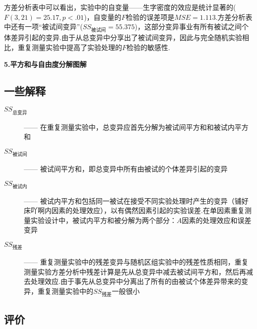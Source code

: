 方差分析表中可以看出，实验中的自变量——生字密度的效应是统计显著的($F \left( 3,21 \right) = 25.17, p < .01 $)，自变量的$F$检验的误差项是$MSE=1.113$.方差分析表中还有一项“被试间变异”($SS_{\text{被试间}}=55.375$)，这部分变异事业有所有被试之间个体差异引起的变异.由于从总变异中分享出了被试间变异，因此与完全随机实验相比，重复测量实验中提高了实验处理的$F$检验的敏感性.

\textbf{5.平方和与自由度分解图解}

\subsection{一些解释}

\begin{description}
\item[$SS_{\text{总变异}}$] —— 在重复测量实验中，总变异应首先分解为被试间平方和和被试内平方和
\item [$SS_{\text{被试间}}$] —— 被试间平方和，即总变异中所有由被试的个体差异引起的变异
\item [$SS_{\text{被试内}}$] —— 被试内平方和包括同一被试在接受不同实验处理时产生的变异（铺好床吖啊内因素的处理效应），以有偶然因素引起的实验误差.在单因素重复测量实验设计中，被试内平方和被分解为两个部分：$A$因素的处理效应和误差变异
\item [$SS_{\text{残差}}$]   —— 重复测量实验中的残差变异与随机区组实验中的残差性质相同，重复测量实验方差分析中残差计算是先从总变异中减去被试间平方和，然后再减去处理效应.由于事先从总变异中分离出了所有的由被试个体差异带来的变异，重复测量实验中的$SS_{\text{残差}}$一般很小

\end{description}

\subsection{评价}

